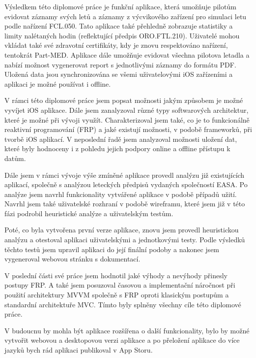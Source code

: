 \documentclass[thesis=M,czech]{FITthesis}[2012/06/26]
\begin{document}
\begin{conclusion}
Výsledkem této diplomové práce je funkční aplikace, která umožňuje pilotům evidovat záznamy svých letů a záznamy z výcvikového zařízení pro simulaci letu podle nařízení FCL.050. Tato aplikace také přehledně zobrazuje statistiky a limity nalétaných hodin (reflektující předpis ORO.FTL.210). Uživatelé mohou vkládat také své zdravotní certifikáty, kdy je znovu respektováno nařízení, tentokrát Part-MED. Aplikace dále umožňuje evidovat všechna pilotova letadla a nabízí možnost vygenerovat report s jednotlivými záznamy do formátu PDF. Uložená data jsou synchronizována se všemi uživatelovými iOS zařízeními a aplikaci je možné používat i offline.

V rámci této diplomové práce jsem popsat možnosti jakým způsobem je možné vyvíjet iOS aplikace. Dále jsem zanalyzoval různé typy softwarových architektur, které je možné při vývoji využít. Charakterizoval jsem také, co je to funkcionálně reaktivní programování (FRP) a jaké existují možnosti, v podobě frameworků, při tvorbě iOS aplikací. V neposlední řadě jsem analyzoval možnosti uložení dat, které byly hodnoceny i z pohledu jejich podpory online a offline přístupu k datům. 

Dále jsem v rámci vývoje výše zmíněné aplikace provedl analýzu již existujících aplikací, společně s analýzou leteckých předpisů vydaných společností EASA. Po analýze jsem navrhl funkcionality vytvářené aplikace v podobě případů užití. Navrhl jsem také uživatelské rozhraní v podobě wireframu, které jsem již v této fázi podrobil heuristické analýze a uživatelským testům.

Poté, co byla vytvořena první verze aplikace, znovu jsem provedl heuristickou analýzu a otestoval aplikaci uživatelskými a jednotkovými testy. Podle výsledků těchto testů jsem upravil aplikaci do její finální podoby a nakonec jsem vygeneroval webovou stránku s dokumentací.

V poslední části své práce jsem hodnotil jaké výhody a nevýhody přinesly postupy FRP. A také jsem posuzoval časovou a implementační náročnost při použití architektury MVVM společně s FRP oproti klasickým postupům a standardní architektuře MVC. Tímto byly splněny všechny cíle této diplomové práce.

V budoucnu by mohla být aplikace rozšířena o další funkcionality, bylo by možné vytvořit webovou a desktopovou verzi aplikace a po přeložení aplikace do více jazyků bych rád aplikaci publikoval v App Storu.

\end{conclusion}
\end{document}
